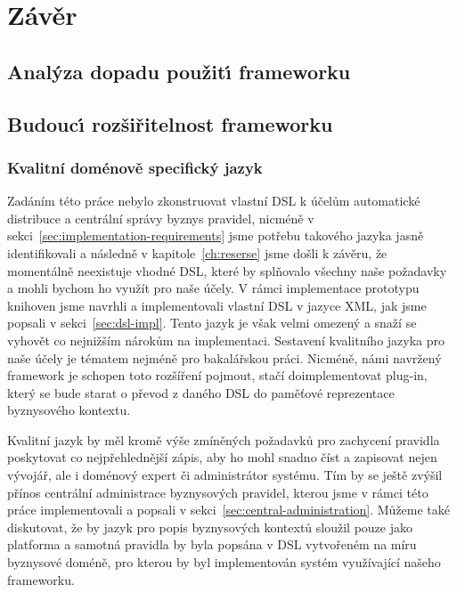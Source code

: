 

\chapter{Závěr}\label{ch:zaver}

\section{Anal\'yza dopadu použit\'{\i} frameworku}

\section{Budouc\'{\i} rozšiřitelnost frameworku}

\subsection{Kvalitní doménově specifický jazyk}
Zadáním této práce nebylo zkonstruovat vlastní \gls{DSL}
k účelům automatické distribuce a centrální správy byznys pravidel,
nicméně v sekci~\ref{sec:implementation-requirements} jsme potřebu takového
jazyka jasně identifikovali a následně v kapitole~\ref{ch:reserse}
jsme došli k závěru, že momentálně neexistuje vhodné \gls{DSL},
které by splňovalo všechny naše požadavky a mohli bychom ho
využít pro naše účely. V rámci implementace prototypu knihoven
jsme navrhli a implementovali vlastní \gls{DSL} v jazyce \gls{XML},
jak jsme popsali v sekci~\ref{sec:dsl-impl}. Tento jazyk je však
velmi omezený a snaží se vyhovět co nejnižším nárokům na implementaci.
Sestavení kvalitního jazyka pro naše účely je tématem nejméně pro
bakalářskou práci. Nicméně, námi navržený framework je schopen toto
rozšíření pojmout, stačí doimplementovat plug-in, který se bude starat
o převod z daného \gls{DSL} do paměťové reprezentace byznysového kontextu.

Kvalitní jazyk by měl kromě výše zmíněných požadavků pro zachycení
pravidla poskytovat co nejpřehlednější zápis, aby ho mohl snadno číst a zapisovat
nejen vývojář, ale i doménový expert či administrátor systému. Tím by se
ještě zvýšil přínos centrální administrace byznysových pravidel, kterou jsme v rámci
této práce implementovali a popsali v sekci~\ref{sec:central-administration}.
Můžeme také diskutovat, že by jazyk pro popis byznysových kontextů sloužil pouze
jako platforma a samotná pravidla by byla popsána v \gls{DSL} vytvořeném na míru
byznysové doméně, pro kterou by byl implementován systém využívající našeho frameworku.



